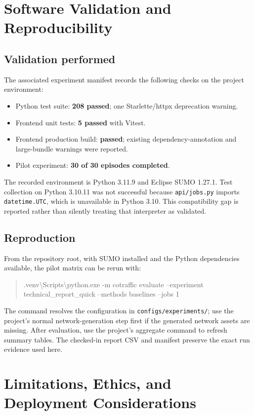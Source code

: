 \documentclass[11pt,a4paper]{article}
\begin{document}
\section{Software Validation and Reproducibility}
\subsection{Validation performed}
The associated experiment manifest records the following checks on the project
environment:
\begin{itemize}
  \item Python test suite: \textbf{208 passed}; one Starlette/httpx deprecation warning.
  \item Frontend unit tests: \textbf{5 passed} with Vitest.
  \item Frontend production build: \textbf{passed}; existing dependency-annotation and
  large-bundle warnings were reported.
  \item Pilot experiment: \textbf{30 of 30 episodes completed}.
\end{itemize}

The recorded environment is Python 3.11.9 and Eclipse SUMO 1.27.1. Test collection on
Python 3.10.11 was not successful because \texttt{api/jobs.py} imports
\texttt{datetime.UTC}, which is unavailable in Python 3.10. This compatibility gap is
reported rather than silently treating that interpreter as validated.

\subsection{Reproduction}
From the repository root, with SUMO installed and the Python dependencies available,
the pilot matrix can be rerun with:
\begin{quote}\small\ttfamily
.venv\textbackslash Scripts\textbackslash python.exe -m cotraffic evaluate
--experiment technical\_report\_quick --methods baselines --jobs 1
\end{quote}
The command resolves the configuration in \texttt{configs/experiments/}; use the
project's normal network-generation step first if the generated network assets are
missing. After evaluation, use the project's aggregate command to refresh summary
tables. The checked-in report CSV and manifest preserve the exact run evidence used
here.

\section{Limitations, Ethics, and Deployment Considerations}
\end{document}

